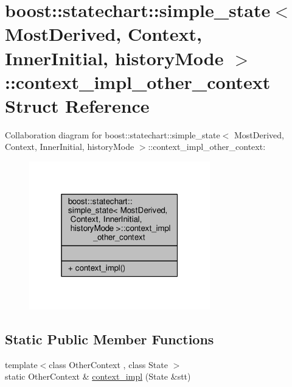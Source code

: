 \hypertarget{structboost_1_1statechart_1_1simple__state_1_1context__impl__other__context}{}\section{boost\+:\+:statechart\+:\+:simple\+\_\+state$<$ Most\+Derived, Context, Inner\+Initial, history\+Mode $>$\+:\+:context\+\_\+impl\+\_\+other\+\_\+context Struct Reference}
\label{structboost_1_1statechart_1_1simple__state_1_1context__impl__other__context}


Collaboration diagram for boost\+:\+:statechart\+:\+:simple\+\_\+state$<$ Most\+Derived, Context, Inner\+Initial, history\+Mode $>$\+:\+:context\+\_\+impl\+\_\+other\+\_\+context\+:
\nopagebreak
\begin{figure}[H]
\begin{center}
\leavevmode
\includegraphics[width=223pt]{structboost_1_1statechart_1_1simple__state_1_1context__impl__other__context__coll__graph}
\end{center}
\end{figure}
\subsection*{Static Public Member Functions}
\begin{DoxyCompactItemize}
\item 
{\footnotesize template$<$class Other\+Context , class State $>$ }\\static Other\+Context \& \mbox{\hyperlink{structboost_1_1statechart_1_1simple__state_1_1context__impl__other__context_aa266014585843224104f24cb0532d16f}{context\+\_\+impl}} (State \&stt)
\end{DoxyCompactItemize}


